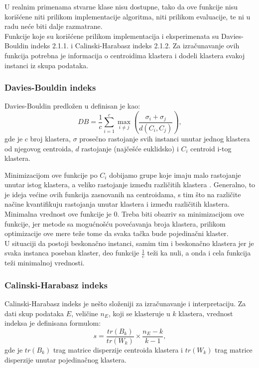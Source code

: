 \documentclass[a4paper,serbian]{symopissr}
\begin{document}
U realnim primenama stvarne klase nisu dostupne, tako da ove funkcije nisu korišćene niti prilikom implementacije algoritma, niti prilikom evaluacije, te ni u radu neće biti dalje razmatrane.\\
Funkcije koje su korišćene prilikom implementacija i eksperimenata su Davies-Bouldin indeks 2.1.1. i Calinski-Harabasz indeks 2.1.2.
Za izračunavanje ovih funkcija potrebna je informacija o centroidima klastera i dodeli klastera svakoj instanci iz skupa podataka.   

\subsubsection{Davies-Bouldin indeks}
\label{sec:db}
Davies-Bouldin predložen u \cite{db_index} definisan je kao:
%
\begin{equation}
DB = \frac{1}{c}\sum_{i=1}^{c}\max_{i \neq j} \left( \frac{\sigma_i + \sigma_j}{d(C_i, C_j)} \right),
\end{equation}
%
gde je $c$ broj klastera, $\sigma$ prosečno rastojanje svih instanci unutar jednog klastera od njegovog centroida, $d$ rastojanje (najčešće euklidsko) i $C_i$ centroid i-tog klastera.

Minimizacijom ove funkcije po $C_i$ dobijamo grupe koje imaju malo rastojanje unutar istog klastera, a veliko rastojanje između različitih klastera \cite{db_index}. Generalno, to je ideja većine ovih funkcija zasnovanih na centroidama, s tim što na različite načine kvantifikuju rastojanja unutar klastera i između različitih klastera.\\
Minimalna vrednost ove funkcije je 0. Treba biti obazriv sa minimizacijom ove funkcije, jer metode sa mogućnošću povećavanja broja klastera, prilikom optimizacije ove mere teže tome da svaka tačka bude pojedinačni klaster.\\
U situaciji da postoji beskonačno instanci, samim tim i beskonačno klastera jer je svaka instanca poseban klaster, deo funkcije $\frac{1}{c}$ teži ka nuli, a onda i cela funkcija teži minimalnoj vrednosti.

\subsubsection{Calinski-Harabasz indeks}
\label{sec:ch}
Calinski-Harabasz indeks \cite{ch_score} je nešto složeniji za izračunavanje i interpretaciju.
Za dati skup podataka $E$, veličine $n_E$, koji se klasteruje u $k$ klastera, vrednost indeksa je definisana formulom:
%
\begin{equation}
s = \frac{tr(B_k)}{tr(W_k)} \times \frac{n_E - k}{k - 1},
\end{equation}
%
gde je $tr(B_k)$ trag matrice disperzije centroida klastera i $tr(W_k)$ trag matrice disperzije unutar pojedinačnog klastera.
\end{document}
